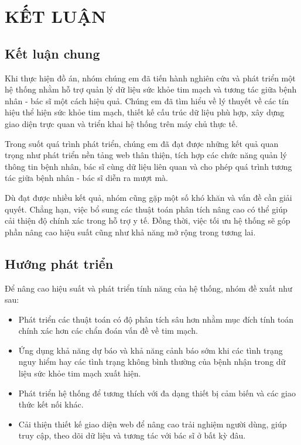 
\section*{KẾT LUẬN}
\subsection*{Kết luận chung}

Khi thực hiện đồ án, nhóm chúng em đã tiến hành nghiên cứu và phát triển một hệ thống nhằm hỗ trợ quản lý dữ liệu sức khỏe tim mạch và tương tác giữa bệnh nhân - bác sĩ một cách hiệu quả.
Chúng em đã tìm hiểu về lý thuyết về các tín hiệu thể hiện sức khỏe tim mạch, thiết kế cấu trúc dữ liệu phù hợp, xây dựng giao diện trực quan và triển khai hệ thống trên máy chủ thực tế.

Trong suốt quá trình phát triển, chúng em đã đạt được những kết quả quan trọng như phát triển nền tảng web thân thiện, tích hợp các chức năng quản lý thông tin bệnh nhân, bác sĩ cùng dữ liệu liên quan và cho phép quá trình tương tác giữa bệnh nhân - bác sĩ diễn ra mượt mà.

Dù đạt được nhiều kết quả, nhóm cũng gặp một số khó khăn và vấn đề cần giải quyết. Chẳng hạn, việc bổ sung các thuật toán phân tích nâng cao có thể giúp cải thiện độ chính xác trong hỗ trợ y tế. Đồng thời, việc tối ưu hệ thống sẽ góp phần nâng cao hiệu suất cũng như khả năng mở rộng trong tương lai.
\subsection*{Hướng phát triển}


Để nâng cao hiệu suất và phát triển tính năng của hệ thống, nhóm đề xuất như sau:

\begin{adjustwidth}{1.5em}{}
	\begin{itemize}
		\item Phát triển các thuật toán có độ phân tích sâu hơn nhằm mục đích tính toán chính xác hơn các chẩn đoán vấn đề về tim mạch.

		\item Ứng dụng khả năng dự báo và khả năng cảnh báo sớm khi các tình trạng nguy hiểm hay các tình trạng không bình thường của bệnh nhận trong dữ liệu sức khỏe tim mạch xuất hiện.


		\item Phát triển hệ thống để tương thích với đa dạng thiết bị cảm biến và các giao thức kết nối khác.


		\item Cải thiện thiết kế giao diện web để nâng cao trải nghiệm người dùng, giúp truy cập, theo dõi dữ liệu và tương tác với bác sĩ ở bất kỳ đâu.

	\end{itemize}
\end{adjustwidth}


